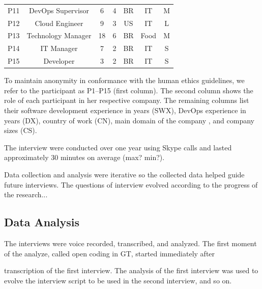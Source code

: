 \begin{table}[t]
\begin{tabular}{ccccccc}
P11                  & DevOps Supervisor                & 6            & 4           & BR            & IT                  & M                               \\

P12                  & Cloud Engineer              & 9            & 3           & US            & IT                  & L                               \\

P13                  & Technology Manager                 & 18            & 6           & BR            & Food                  & M                               \\

P14                  & IT Manager            & 7            & 2           & BR            & IT                  & S                               \\

P15                  & Developer        & 3            & 2           & BR            & IT                  & S
\end{tabular}
\end{table}


To maintain anonymity in conformance with the human ethics guidelines,
we refer to the participant as P1--P15 (first column).
The second column shows the role of
each participant in her respective company. The remaining columns list their
software development experience in years (SWX), DevOps experience in years (DX),
country of work (CN), main domain of the company , and company
sizes (CS).


The interview were conducted over one year using Skype calls and lasted
approximately 30 minutes on average (max? min?).

Data collection and analysis were iterative so the collected data helped guide
future interviews. The questions of interview evolved according to the progress
of the research...

\subsection{Data Analysis}
The interviews were voice recorded, transcribed, and analyzed. The first moment
of the analyze, called open coding in GT, started immediately after

transcription of the first interview. The analysis of the
first interview was used to evolve the interview script to be used in
the second interview, and so on.

